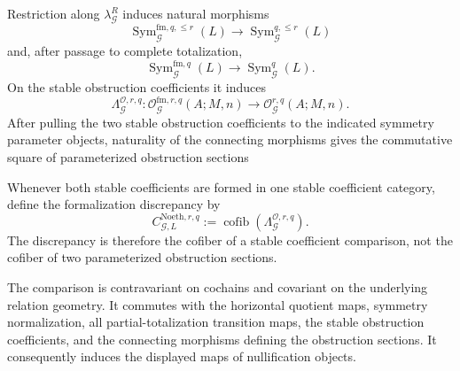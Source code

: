 \begin{construction}
\label{constr:symmetry-noether-formalized-to-raw-noether-comparison}
Restriction along $\lambda_{\mathcal G}^R$ induces natural morphisms
\[
\operatorname{Sym}_{\mathcal G}^{\mathrm{fm},q,\le r}(L)
\longrightarrow
\operatorname{Sym}_{\mathcal G}^{q,\le r}(L)
\]
and, after passage to complete totalization,
\[
\operatorname{Sym}_{\mathcal G}^{\mathrm{fm},q}(L)
\longrightarrow
\operatorname{Sym}_{\mathcal G}^{q}(L).
\]
On the stable obstruction coefficients it induces
\[
\boxed{
\Lambda_{\mathcal G}^{\mathcal O,r,q}:
\mathcal O_{\mathcal G}^{\mathrm{fm},r,q}(A;M,n)
\longrightarrow
\mathcal O_{\mathcal G}^{r,q}(A;M,n).
}
\]
After pulling the two stable obstruction coefficients to the indicated symmetry
parameter objects, naturality of the connecting morphisms gives the commutative square of
parameterized obstruction sections
Whenever both stable coefficients are formed in one stable coefficient category,
define the formalization discrepancy by
\[
\boxed{
C_{\mathcal G,L}^{\mathrm{Noeth},r,q}
:=
\operatorname{cofib}
\left(
\Lambda_{\mathcal G}^{\mathcal O,r,q}
\right).
}
\]
The discrepancy is therefore the cofiber of a stable coefficient comparison, not
the cofiber of two parameterized obstruction sections.
\end{construction}

\begin{proposition}
\label{prop:symmetry-noether-variance-and-compatibility}
The comparison is contravariant on cochains and covariant on the underlying
relation geometry.  It commutes with the horizontal quotient maps, symmetry
normalization, all partial-totalization transition maps, the stable obstruction
coefficients, and the connecting morphisms defining the obstruction sections.
It consequently induces the displayed maps of nullification objects.
\end{proposition}

